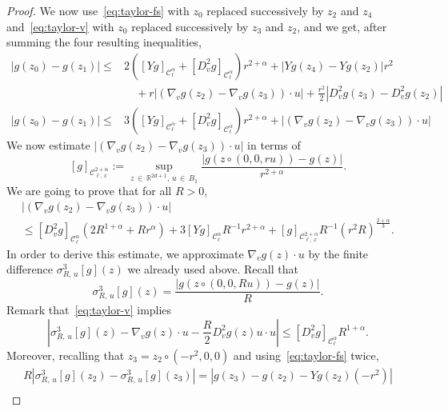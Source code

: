 \documentclass[AHL,Unicode,longabstracts,published]{cedram}
\newcommand{\R}{\mathbb{R}}
\newcommand{\cC}{\mathcal{C}}
\begin{document}
\begin{proof}
\goodbreak
We now use~\eqref{eq:taylor-fs} with $z_0$ replaced successively by $z_2$ and $z_4$ and~\eqref{eq:taylor-v} with $z_0$ replaced successively by $z_3$ and $z_2$, and we get, after summing the four resulting inequalities,
\begin{equation}\label{e:almost}
\begin{aligned}
\left|g(z_0) -g(z_1)\right| \le & 2 \left([Yg]_{\cC^\alpha_\ell} + \left[D^2_v g\right]_{\cC^\alpha_\ell}\right) r^{2+\alpha} + \left| Yg (z_4)-Yg(z_2)\right| r^2 \\
&\quad+ r \left| \left(\nabla_vg (z_2)-\nabla_v g (z_3)\right) \cdot u \right| + \frac{r^2} 2 \left| D_v^2 g (z_3)-D_v^2 g(z_2)\right| \\
\left|g(z_0) -g(z_1)\right| \le & 3\left([Yg]_{\cC^\alpha_\ell} + \left[D^2_v g\right]_{\cC^\alpha_\ell}\right) r^{2+\alpha}+ \left| \left(\nabla_vg (z_2)-\nabla_v g (z_3)\right) \cdot u \right|
\end{aligned}
\end{equation}
We now estimate $| (\nabla_vg (z_2)-\nabla_v g (z_3)) \cdot u |$ in terms of
\[
[g]_{\cC^{2+\alpha}_{\ell,\,x} } := \sup_{z\,\in\,\R^{2d+1}, \,u\,\in\,B_1} \frac{|g(z \circ (0,0,ru)) - g(z)|}{r^{2+\alpha}}.
\]
We are going to prove that for all $R>0$,
\begin{multline}\label{e:dvx}
\left| \left(\nabla_vg (z_2)-\nabla_v g (z_3)\right) \cdot u \right|\\
\le \left[D^2_v g\right]_{\cC^\alpha_\ell} \left(2R^{1+\alpha}+Rr^\alpha\right) + 3 [Yg]_{\cC^\alpha_\ell} R^{-1} r^{2+\alpha} + [g]_{\cC^{2+\alpha}_{\ell,\,x}} R^{-1} \left(r^2 R\right)^{\frac{2+\alpha}3}.
\end{multline}
In order to derive this estimate, we approximate $\nabla_v g (z) \cdot u$ by the finite difference $\sigma^3_{R,\,u}[g](z)$ we already used above. Recall that
\[
\sigma^3_{R,\,u} [g](z) = \frac{|g(z \circ (0,0,Ru)) - g(z)|}{R}.
\]
Remark that~\eqref{eq:taylor-v} implies
\begin{equation}\label{e:1}
\left|\sigma^3_{R,\,u} [g] (z) - \nabla_v g (z) \cdot u - \frac{R}2 D^2_v g (z) u \cdot u \right| \le \left[D^2_v g\right]_{\cC^\alpha_\ell} R^{1+\alpha}.
\end{equation}
Moreover, recalling that $z_3 = z_2 \circ (-r^2,0,0)$ and using~\eqref{eq:taylor-fs} twice,
\begin{multline} \label{e:2}
 R \left|\sigma^3_{R,\,u} [g](z_2) - \sigma^3_{R,\,u} [g](z_3) \right|
 = \left| g(z_3) - g(z_2) - Yg (z_2) \left(-r^2\right) \right| \\

\end{multline}
\end{proof}
\end{document}
